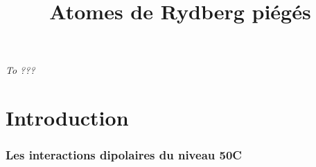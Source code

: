 \documentclass[11pt,a4paper,twoside]{book}
\title{Atomes de Rydberg piégés}
\begin{document}
\newcommand{\numv}[1]{\num[output-decimal-marker={,}]{#1}~}
\newcommand{\SIv}[2]{\SI[output-decimal-marker={,}]{#1}{#2}~}
\newcommand{\SIvv}[2]{\SI[output-decimal-marker={,}]{#1}{#2}}
\newcommand{\Kel}{\si{\kelvin}}
\newcommand{\mK}{\si{\milli\kelvin}}
\newcommand{\uK}{\si{\micro\kelvin}}
\newcommand{\citefr}[1]{\cite{#1}}
\renewcommand{\vec}[1]{\mathbf{#1}}
\newcommand{\dip}{d}
\newcommand{\VdW}{van der Waals }
\newcommand{\umx}{\si{\um^6} }
\newcommand{\Rb}[1]{${}^{#1}$Rb}
\newcommand{\Ryd}{\textnormal{Ryd }}
\newcommand{\pdt}{\partial_t}
\newcommand{\eff}{\textnormal{eff }}
\newcommand{\Id}{\mathbb{I}}
\renewcommand{\thefootnote}{\fnsymbol{footnote}}
\renewcommand \thechapter{\Roman{chapter}}
\newcommand{\kb}{\mathrm{k_B}}


\frontmatter
{}
\thispagestyle{empty}
\vspace*{0.2\textheight}
\begin{center}
\emph{To ???}
\end{center}
\vspace*{\fill}\clearpage
\makeatletter
\let\ps@plain\ps@empty

\makeatother

\tableofcontents
\thispagestyle{fancyplain}
\listoffigures
\listoftables
\thispagestyle{fancyplain}
\mainmatter
{}

\chapter*{Introduction}\label{chapter:intro}









\subsection{Les interactions dipolaires du niveau 50C}
	
\end{document}
